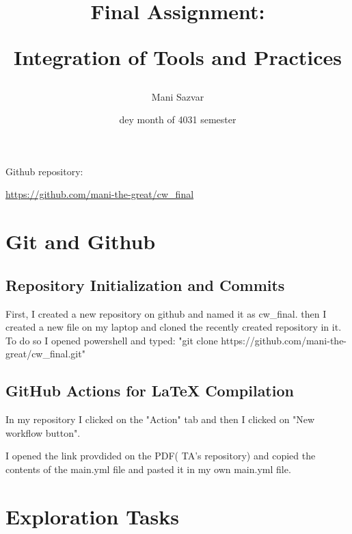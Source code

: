 \documentclass[12pt, letterpaper]{article}
\title{Final Assignment:

Integration of Tools and Practices
}
\author{Mani Sazvar}
\date{dey month of 4031 semester}
\begin{document}
\maketitle
\begin{center}
Github repository:

\url{https://github.com/mani-the-great/cw_final}
\end{center}
\thispagestyle{empty}
\newpage
{} 
\tableofcontents
\newpage
\section{Git and Github}
\subsection{Repository Initialization and Commits}
First, I created a new repository on github and named it as cw\_final.
then I created a new file on my laptop and cloned the recently created repository in it. To do so I opened powershell and typed: "git clone https://github.com/mani-the-great/cw\_final.git"
\subsection{ GitHub Actions for LaTeX Compilation
}
In my repository I clicked on the "Action" tab and then I clicked on "New workflow button".

I opened the link provdided on the PDF( TA's repository) and copied the contents of the main.yml file and pasted it in my own main.yml file.
\section{Exploration Tasks}
\end{document}
